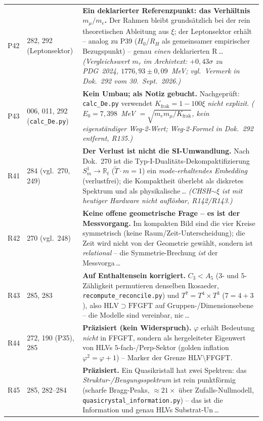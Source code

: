 \begin{longtable}{@{}p{0.9cm}p{3.1cm}p{10.2cm}@{}}
P42 & 282, 292 (Leptonsektor) & \textbf{Ein deklarierter Referenzpunkt: das Verhältnis $m_\mu/m_e$.} Der Rahmen bleibt grundsätzlich bei der rein theoretischen Ableitung aus $\xi$; der Leptonsektor erhält -- analog zu P39 ($H_0$/$R_H$ als gemeinsamer empirischer Bezugspunkt) -- genau \emph{einen} deklarierten R\,\ldots{} \emph{(Vergleichswert $m_\tau$ im Archivtext: $+0{,}43\sigma$ zu PDG~2024, $1776{,}93\pm0{,}09$~MeV; vgl.\ Vermerk in Dok.~292 vom 30.~Sept.~2026.)} \\
P43 & 006, 011, 292 (\texttt{calc\_De.py}) & \textbf{Kein Umbau; als Notiz gebucht.} Nachgeprüft: \texttt{calc\_De.py} verwendet $K_{\text{frak}}=1-100\xi$ \emph{nicht explizit}. \emph{($E_0=7{,}398$~MeV $=\sqrt{m_em_\mu/K_{\mathrm{frak}}}$, kein eigenständiger Weg-2-Wert; Weg-2-Formel in Dok.~292 entfernt, R135.)} \\
R41 & 284 (vgl.\ 270, 249) & \textbf{Der Verlust ist nicht die SI-Umwandlung.} Nach Dok.~270 ist die Typ-I-Dualitäts-Dekompaktifizierung $S^1_m\!\to\!\mathbb{R}_t$ ($\tilde{T}\cdot m=1$) ein \emph{mode-erhaltendes Embedding} (verlustfrei); die Kompaktheit überlebt als diskretes Spektrum und als physikalische\,\ldots{} \emph{(CHSH$\sim\xi$ ist mit heutiger Hardware nicht auflösbar, R142/R143.)} \\
R42 & 270 (vgl.\ 248) & \textbf{Keine offene geometrische Frage -- es ist der Messvorgang.} Im kompakten Bild sind die vier Kreise symmetrisch (keine Raum/Zeit-Unterscheidung); die Zeit wird nicht von der Geometrie gewählt, sondern ist \emph{relational} -- die Symmetrie-Brechung \emph{ist} der Messvorga\,\ldots \\
R43 & 285, 283 & \textbf{Auf Enthaltensein korrigiert.} $C_3<A_5$ ($3$- und $5$-Zähligkeit permutieren denselben Ikosaeder, \texttt{recompute\_reconcile.py}) und $T^7=T^4\times T^3$ ($7=4+3$), also $\mathrm{HLV}\supset\mathrm{FFGFT}$ auf Gruppen-/Dimensionsebene -- die Modelle sind vereinbar, nic\,\ldots \\
R44 & 272, 190 (P35), 285 & \textbf{Pr\"azisiert (kein Widerspruch).} $\varphi$ erh\"alt Bedeutung \emph{nicht} in FFGFT, sondern als hergeleiteter Eigenwert von HLVs $5$-fach-/Perp-Sektor (golden inflation $\varphi^2=\varphi+1$) -- Marker der Grenze HLV$\setminus$FFGFT. \\
R45 & 285, 282--284 & \textbf{Pr\"azisiert.} Ein Quasikristall hat zwei Spektren: das \emph{Struktur-/Beugungsspektrum} ist rein punktf\"ormig (scharfe Bragg-Peaks, $\approx21\times$ \"uber Zufalls-Nullmodell, \texttt{quasicrystal\_information.py}) -- das ist die Information und genau HLVs Substrat-Un\,\ldots \\

\end{longtable}
